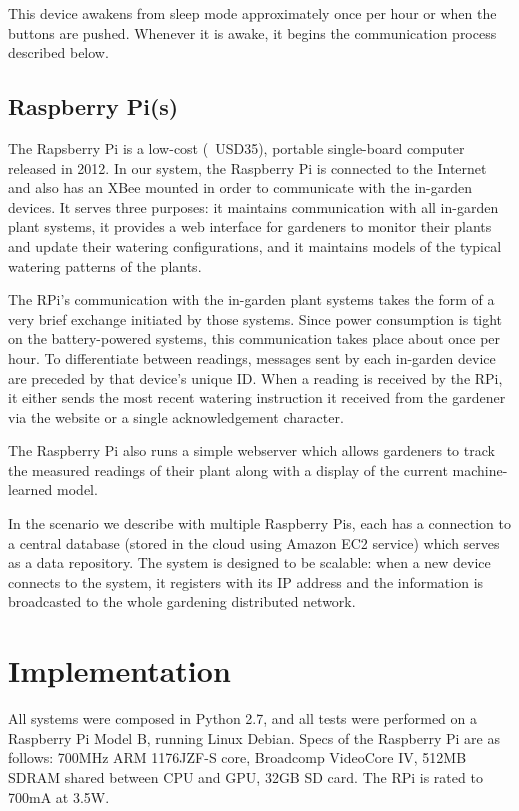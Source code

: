 \documentclass[a4paper]{acm_proc_article-sp}
\begin{document}
This device awakens from sleep mode approximately once per hour or when the buttons are pushed.  Whenever it is awake, it begins the communication process described below.

\subsection{Raspberry Pi(s)}

The Rapsberry Pi is a low-cost (~USD35), portable single-board computer released in 2012. In our system, the Raspberry Pi is connected to the Internet and also has an XBee mounted in order to communicate with the in-garden devices.  It serves three purposes: it maintains communication with all in-garden plant systems, it provides a web interface for gardeners to monitor their plants and update their watering configurations, and it maintains models of the typical watering patterns of the plants.

The RPi's communication with the in-garden plant systems takes the form of a very brief exchange initiated by those systems.  Since power consumption is tight on the battery-powered systems, this communication takes place about once per hour.  To differentiate between readings, messages sent by each in-garden device are preceded by that device's unique ID.  When a reading is received by the RPi, it either sends the most recent watering instruction it received from the gardener via the website or a single acknowledgement character.

The Raspberry Pi also runs a simple webserver which allows gardeners to track the measured readings of their plant along with a display of the current machine-learned model.

In the scenario we describe with multiple Raspberry Pis, each has a connection to a central database (stored in the cloud using Amazon EC2 service) which serves as a data repository. The system is designed to be scalable: when a new device connects to the system, it registers with its IP address and the information is broadcasted to the whole gardening distributed network. 

\section{Implementation}

All systems were composed in Python 2.7, and all tests were performed on a Raspberry Pi Model B, running Linux Debian.  Specs of the Raspberry Pi are as follows: 700MHz ARM 1176JZF-S core, Broadcomp VideoCore IV, 512MB SDRAM shared between CPU and GPU, 32GB SD card.  The RPi is rated to 700mA at 3.5W. 
\end{document}
